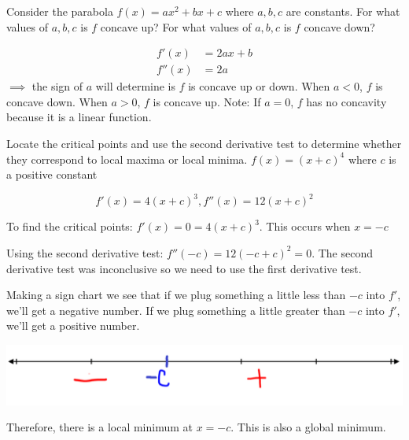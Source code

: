 \documentclass[nooutcomes]{ximera}
\begin{document}
\begin{problem}
Consider the parabola $f(x)=ax^2+bx+c$ where $a,b,c$ are constants.  For what values of $a,b,c$ is $f$ concave up?  For what values of $a,b,c$ is $f$ concave down?				
\begin{freeResponse}
\begin{align*}
f'(x)&=2ax+b\\
f''(x)&=2a
\end{align*}
$\implies$ the sign of $a$ will determine is $f$ is concave up or down.  When $a<0$, $f$ is concave down.  When $a>0$, $f$ is concave up.  Note: If $a=0$, $f$ has no concavity because it is a linear function.


				
\end{freeResponse}
				
\end{problem}	


\begin{problem}
Locate the critical points and use the second derivative test to determine whether they correspond to local maxima or local minima.
$f(x)=(x+c)^4$ where $c$ is a positive constant 

\begin{freeResponse}

$$f'(x)=4(x+c)^3, f''(x)=12(x+c)^2$$

To find the critical points: $f'(x)=0=4(x+c)^3$.  This occurs when $x=-c$
 
Using the second derivative test: $f''(-c)=12(-c+c)^2=0$.  The second derivative test was inconclusive so we need to use the first derivative test.

Making a sign chart we see that if we plug something a little less than $-c$ into $f'$, we'll get a negative number.  If we plug something a little greater than $-c$ into $f'$, we'll get a positive number. 

      \begin{image}
        \includegraphics[scale = 0.3]{figure4.png}
             \end{image}

Therefore, there is a local minimum at $x=-c$.  This is also a global minimum.

\end{freeResponse}
\end{problem}
\end{document}
